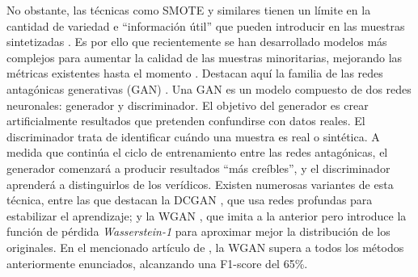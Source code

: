 No obstante, las técnicas como SMOTE y similares tienen un límite en la cantidad de variedad e ``información útil'' que pueden introducir en las muestras sintetizadas \cite{nafi2020addressing}. Es por ello que recientemente se han desarrollado modelos más complejos para aumentar la calidad de las muestras minoritarias, mejorando las métricas existentes hasta el momento \cite{johnson2019survey,siniosoglou2021unsupervised}. Destacan aquí la familia de las redes antagónicas generativas (GAN) \cite{arjovsky2017wasserstein,johnson2019survey,siniosoglou2021unsupervised,yan2019joint,GoogleGAN}. Una GAN es un modelo compuesto de dos redes neuronales: generador y discriminador. El objetivo del generador es crear artificialmente resultados que pretenden confundirse con datos reales. El discriminador trata de identificar cuándo una muestra es real o sintética. A medida que continúa el ciclo de entrenamiento entre las redes antagónicas, el generador comenzará a producir resultados ``más creíbles'', y el discriminador aprenderá a distinguirlos de los verídicos. Existen numerosas variantes de esta técnica, entre las que destacan la DCGAN \cite{nafi2020addressing}, que usa redes profundas para estabilizar el aprendizaje; y la WGAN \cite{arjovsky2017wasserstein}, que imita a la anterior pero introduce la función de pérdida \textit{Wasserstein-1} para aproximar mejor la distribución de los originales. En el mencionado artículo de \citet{nafi2020addressing}, la WGAN supera a todos los métodos anteriormente enunciados, alcanzando una F1-score del 65\%.